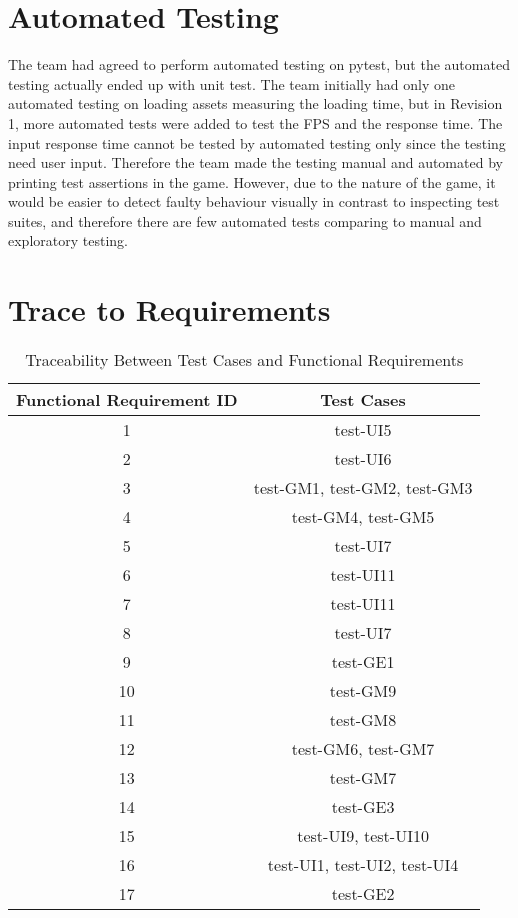 \documentclass[12pt, titlepage]{article}
\begin{document}
\section{Automated Testing}
The team had agreed to perform automated testing on pytest, but the automated testing actually ended up with unit test. The team initially had only one automated testing on loading assets measuring the loading time, but in Revision 1, more automated tests were added to test the FPS and the response time. The input response time cannot be tested by automated testing only since the testing need user input. Therefore the team made the testing manual and automated by printing test assertions in the game. However, due to the nature of the game, it would be easier to detect faulty behaviour visually in contrast to inspecting test suites, and therefore there are few automated tests comparing to manual and exploratory testing.


\section{Trace to Requirements}
\begin{table}[H]
  \begin{center}
    \caption{Traceability Between Test Cases and Functional Requirements }
    \label{tab:table1}
    \begin{tabular}{c|c} 
        \toprule
        \textbf{Functional Requirement ID} & \textbf{Test Cases}\\
        \midrule
        1 & test-UI5\\
        \hline
        2 & test-UI6\\
        \hline
        3 & test-GM1, test-GM2, test-GM3 \\
        \hline
        4 & test-GM4, test-GM5\\
        \hline
        5 & test-UI7\\
        \hline
        6 & test-UI11\\
        \hline
        7 &  test-UI11\\
        \hline
        8 & test-UI7\\
        \hline
        9 & test-GE1\\
        \hline
        10 & test-GM9 \\
        \hline
        11 & test-GM8\\
        \hline
        12 & test-GM6, test-GM7\\
        \hline
        13 & test-GM7\\
        \hline
        14 & test-GE3\\
        \hline
        15 & test-UI9, test-UI10\\
        \hline
        16 & test-UI1, test-UI2, test-UI4\\
        \hline
        17 & test-GE2\\
        \bottomrule
    \end{tabular}
  \end{center}
\end{table}
\end{document}
